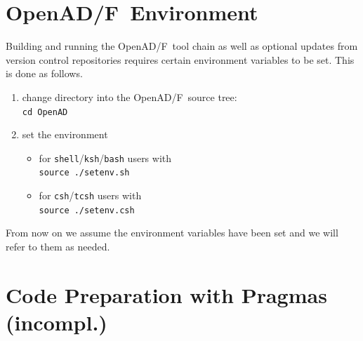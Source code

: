 \documentclass{book}
\newcommand{\OpenADF}{OpenAD/F}
\begin{document}
\section{\OpenADF\ Environment}\label{sec:env}
Building and running the \OpenADF\  tool chain as well as optional updates from 
version control repositories requires certain environment variables to be set. 
This is done as follows.
\begin{enumerate}
\item change directory into the \OpenADF\ source tree:\\
\lstinline{cd OpenAD}
\item set the environment 
\begin{itemize}
\item for \lstinline{shell}/\lstinline{ksh}/\lstinline{bash} users with\\
\lstinline{source ./setenv.sh}
\item for \lstinline{csh}/\lstinline{tcsh} users with\\
\lstinline{source ./setenv.csh}
\end{itemize}
\end{enumerate}
From now on we assume the environment variables have been set and we will refer 
to them as needed.  

\section{Code Preparation with Pragmas (incompl.)} \label{sec:pragmas}
\end{document}
